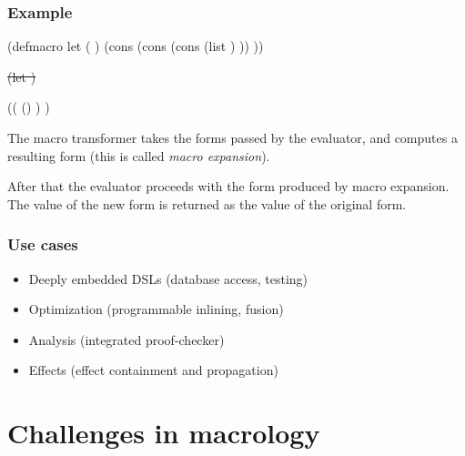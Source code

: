 \documentclass[hyperref={bookmarks=false}]{beamer}
\begin{document}
\begin{frame}[fragile]
\frametitle{Example} %

\begin{lstlistinglike}
\begin{semiverbatim}
(defmacro let (\text{\color{red}{decl}} \text{\color{violet}{body}})
  (cons
   (cons \text{\color{blue}{'lambda}}
         (cons (list \text{\color{red}{(car decl)}}) \text{\color{violet}{body}}))
   \text{\color{red}{(cdr decl)}}))

\sout{(let \text{\color{red}{(x 42)}} \text{\color{violet}{(print x)}})}

((\text{\color{blue}{lambda}} (\text{\color{red}{x}}) \text{\color{violet}{(print x)}}) \text{\color{red}{42}})
\end{semiverbatim}
\end{lstlistinglike}

The macro transformer takes the forms passed by the evaluator,
and computes a resulting form (this is called \emph{macro expansion}).

After that the evaluator proceeds with the form produced by macro expansion.
The value of the new form is returned as the value of the original form.
\end{frame}

\begin{frame}[fragile]
\frametitle{Use cases}

\begin{itemize}
\item Deeply embedded DSLs (database access, testing)
\item Optimization (programmable inlining, fusion)
\item Analysis (integrated proof-checker)
\item Effects (effect containment and propagation)
\end{itemize}

\vskip15pt

\end{frame}

\section{Challenges in macrology}
\end{document}
